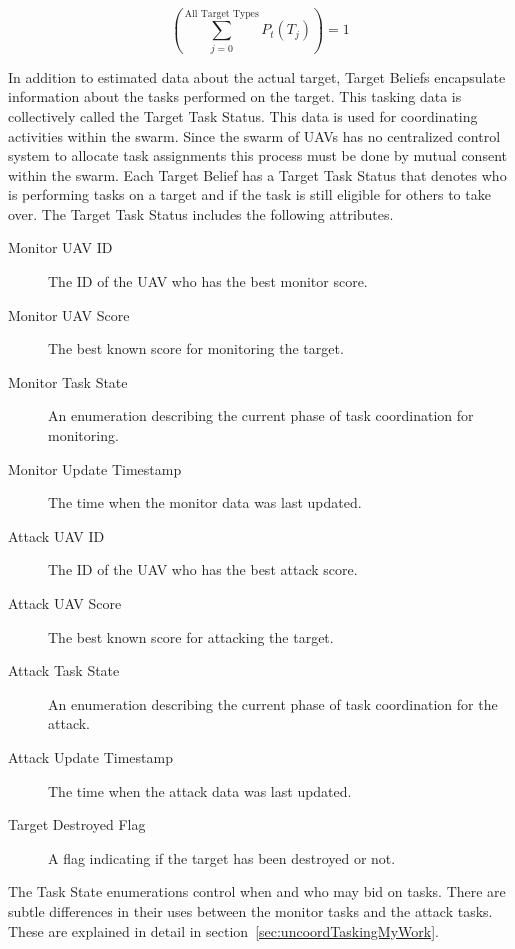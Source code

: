 \begin{multicols*}{2}
\begin{equation}
\label{eq:probsNormalize}
\left( \sum_{j=0}^{\text{All Target Types}}P_{t}(T_{j})\right)  = 1
\end{equation}



In addition to estimated data about the actual target, Target Beliefs encapsulate information about the tasks performed on the target.  This tasking data is collectively called the Target Task Status.  This data is used for coordinating activities within the swarm.  Since the swarm of UAVs has no centralized control system to allocate task assignments this process must be done by mutual consent within the swarm.  Each Target Belief has a Target Task Status that denotes who is performing tasks on a target and if the task is still eligible for others to take over.  The Target Task Status includes the following attributes.

\begin{description}
	\item [Monitor UAV ID] The ID of the UAV who has the best monitor score.
	\item [Monitor UAV Score] The best known score for monitoring the target.
	\item [Monitor Task State] An enumeration describing the current phase of task coordination for monitoring.
	\item [Monitor Update Timestamp] The time when the monitor data was last updated.
	\item [Attack UAV ID] The ID of the UAV who has the best attack score.
	\item [Attack UAV Score] The best known score for attacking the target.
	\item [Attack Task State] An enumeration describing the current phase of task coordination for the attack.
	\item [Attack Update Timestamp] The time when the attack data was last updated.
	\item [Target Destroyed Flag] A flag indicating if the target has been destroyed or not.
\end{description}

The Task State enumerations control when and who may bid on tasks.  There are subtle differences in their uses between the monitor tasks and the attack tasks.  These are explained in detail in  section~\ref{sec:uncoordTaskingMyWork}.


\end{multicols*}
